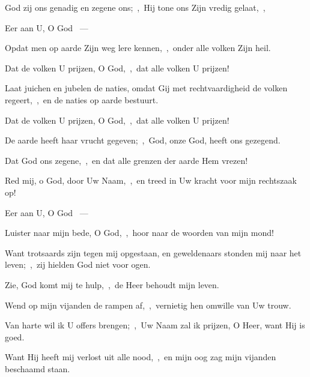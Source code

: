 \documentclass[12pt,twoside,a5paper]{article}
\begin{document}
\begin{halfparskip}
   

  God zij ons genadig en zegene ons;~\sep\ Hij tone ons Zijn vredig gelaat,~\sep

  Eer aan U, O God ~---  

  Opdat men op aarde Zijn weg lere kennen,~\sep\ onder alle volken Zijn heil.

  Dat de volken U prijzen, O God,~\sep\ dat alle volken U prijzen!

  Laat juichen en jubelen de naties, omdat Gij met rechtvaardigheid de volken regeert,~\sep\ en de naties op aarde bestuurt.

  Dat de volken U prijzen, O God,~\sep\ dat alle volken U prijzen!

  De aarde heeft haar vrucht gegeven;~\sep\ God, onze God, heeft ons gezegend.

  Dat God ons zegene,~\sep\ en dat alle grenzen der aarde Hem vrezen!
\end{halfparskip}

\begin{halfparskip}
   

  Red mij, o God, door Uw Naam,~\sep\ en treed in Uw kracht voor mijn rechtszaak op!

  Eer aan U, O God ~---  

  Luister naar mijn bede, O God,~\sep\ hoor naar de woorden van mijn mond!

  Want trotsaards zijn tegen mij opgestaan, en geweldenaars stonden mij naar het leven;~\sep\ zij hielden God niet voor ogen.

  Zie, God komt mij te hulp,~\sep\ de Heer behoudt mijn leven.

  Wend op mijn vijanden de rampen af,~\sep\ vernietig hen omwille van Uw trouw.

  Van harte wil ik U offers brengen;~\sep\ Uw Naam zal ik prijzen, O Heer, want Hij is goed.

  Want Hij heeft mij verlost uit alle nood,~\sep\ en mijn oog zag mijn vijanden beschaamd staan.
\end{halfparskip}
\end{document}
